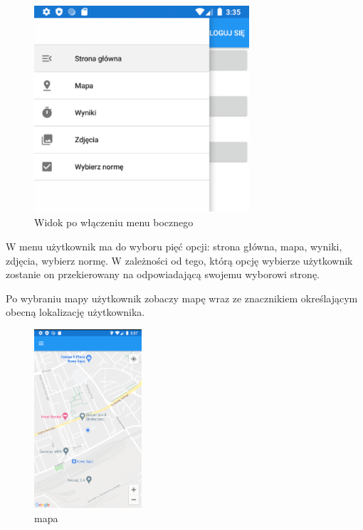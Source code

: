 \begin{figure}[!htb]
	\begin{center}
		\includegraphics[width=8cm]{rys/menu.png}
		\caption{Widok po włączeniu menu bocznego}
		\label{rys:rysunek032}
	\end{center}
\end{figure}

W menu użytkownik ma do wyboru pięć opcji: strona główna, mapa, wyniki, zdjęcia, wybierz normę. W zależności od tego, którą opcję wybierze użytkownik zostanie on przekierowany na odpowiadającą swojemu wyborowi stronę.

Po wybraniu mapy użytkownik zobaczy mapę wraz ze znacznikiem określającym obecną lokalizację użytkownika.

\begin{figure}[!htb]
	\begin{center}
		\includegraphics[width=4cm]{rys/mapa_menu.png}
		\caption{mapa}
		\label{rys:rysunek033}
	\end{center}
\end{figure}



